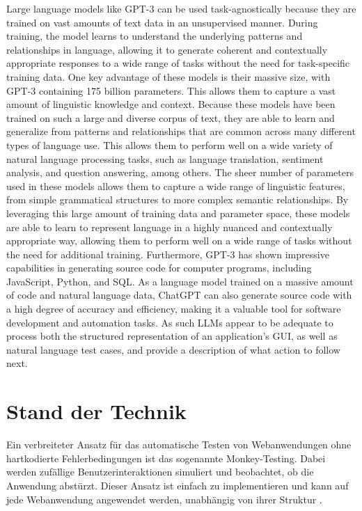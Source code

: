 Large language models like GPT-3 can be used task-agnostically because they are trained on vast amounts of text data in an unsupervised manner. During training, the model learns to understand the underlying patterns and relationships in language, allowing it to generate coherent and contextually appropriate responses to a wide range of tasks without the need for task-specific training data.
One key advantage of these models is their massive size, with GPT-3 containing 175 billion parameters.
This allows them to capture a vast amount of linguistic knowledge and context.
Because these models have been trained on such a large and diverse corpus of text, they are able to learn and generalize from patterns and relationships that are common across many different types of language use. This allows them to perform well on a wide variety of natural language processing tasks, such as language translation, sentiment analysis, and question answering, among others.
The sheer number of parameters used in these models allows them to capture a wide range of linguistic features, from simple grammatical structures to more complex semantic relationships. By leveraging this large amount of training data and parameter space, these models are able to learn to represent language in a highly nuanced and contextually appropriate way, allowing them to perform well on a wide range of tasks without the need for additional training.
Furthermore, GPT-3 has shown impressive capabilities in generating source code for computer programs, including JavaScript, Python, and SQL. As a language model trained on a massive amount of code and natural language data, ChatGPT can also generate source code with a high degree of accuracy and efficiency, making it a valuable tool for software development and automation tasks.
As such LLMs appear to be adequate to process both the structured representation of an application’s GUI, as well as natural language test cases, and provide a description of what action to follow next.

\chapter{Stand der Technik}
\label{ch:RelatedWork}

Ein verbreiteter Ansatz für das automatische Testen von Webanwendungen ohne hartkodierte Fehlerbedingungen ist das sogenannte Monkey-Testing.
Dabei werden zufällige Benutzerinteraktionen simuliert und beobachtet, ob die Anwendung abstürzt.
Dieser Ansatz ist einfach zu implementieren und kann auf jede Webanwendung angewendet werden, unabhängig von ihrer Struktur \cite{monkey_testing}.

